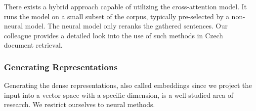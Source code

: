 There exists a hybrid approach capable of utilizing the cross-attention model. 
It runs the model on a small subset of the corpus, typically pre-selected by a non-neural model.
The neural model only reranks the gathered sentences.
Our colleague \citet{dedkova} provides a detailed look into the use of such methods in Czech document retrieval.






\subsubsection{Generating Representations}

Generating the dense representations, also called embeddings since we project the input into a vector space with a specific dimension, is a well-studied area of research.
We restrict ourselves to neural methods. 

